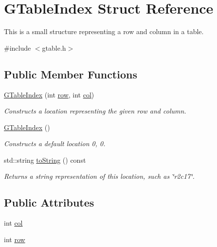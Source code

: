 \hypertarget{structsgl_1_1GTableIndex}{}\section{G\+Table\+Index Struct Reference}
\label{structsgl_1_1GTableIndex}


This is a small structure representing a row and column in a table.  




{\ttfamily \#include $<$gtable.\+h$>$}

\subsection*{Public Member Functions}
\begin{DoxyCompactItemize}
\item 
\mbox{\hyperlink{structsgl_1_1GTableIndex_acce37e5fd80f249f95890ad8aa4aa4e4}{G\+Table\+Index}} (int \mbox{\hyperlink{structsgl_1_1GTableIndex_af1d3cff2e4538e23400e260bae3dadad}{row}}, int \mbox{\hyperlink{structsgl_1_1GTableIndex_afb52e720f5f0c483db5861f9e42e924e}{col}})
\begin{DoxyCompactList}\small\item\em Constructs a location representing the given row and column. \end{DoxyCompactList}\item 
\mbox{\hyperlink{structsgl_1_1GTableIndex_a711af6c0d4a8d8a2616b24adecf0c7e1}{G\+Table\+Index}} ()
\begin{DoxyCompactList}\small\item\em Constructs a default location 0, 0. \end{DoxyCompactList}\item 
std\+::string \mbox{\hyperlink{structsgl_1_1GTableIndex_a1fe5121d6528fdea3f243321b3fa3a49}{to\+String}} () const
\begin{DoxyCompactList}\small\item\em Returns a string representation of this location, such as \char`\"{}r2c17\char`\"{}. \end{DoxyCompactList}\end{DoxyCompactItemize}
\subsection*{Public Attributes}
\begin{DoxyCompactItemize}
\item 
int \mbox{\hyperlink{structsgl_1_1GTableIndex_afb52e720f5f0c483db5861f9e42e924e}{col}}
\item 
int \mbox{\hyperlink{structsgl_1_1GTableIndex_af1d3cff2e4538e23400e260bae3dadad}{row}}
\end{DoxyCompactItemize}


